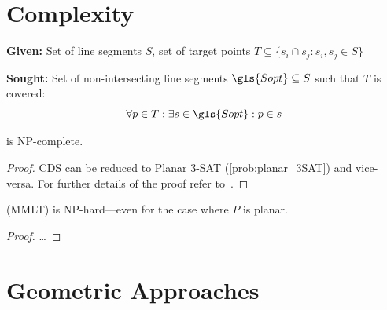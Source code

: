 \section{Complexity}


\begin{problem}
  \label{prob:cds}\hfill
  \begin{labeling}{\hspace{4em}}
    \item[\textbf{Given:}]
      Set of line segments \(S\), 
      set of target points
      \(T \subseteq \{ s_i \cap s_j : s_i,s_j \in S \} \)
    \item[\textbf{Sought:}]
      Set of non-intersecting line segments
      \(\gls{Sopt} \subseteq S\) such that \(T\) is covered:
      \[ \forall p \in T: \exists s \in \gls{Sopt} : p \in s \]
  \end{labeling}
\end{problem}


\begin{theorem}
   is NP-complete.
\end{theorem}

\begin{proof}
  \gls{CDS} can be reduced to Planar 3-SAT (\cref{prob:planar_3SAT})
  and vice-versa. For further details of the proof refer
  to~\cite{mmlt_complexity}.
\end{proof}


\begin{theorem}
   (\gls{MMLT}) is NP-hard---even for the case
  where \(P\) is planar.
\end{theorem}

\begin{proof}
  \ldots{}
\end{proof}

\section{Geometric Approaches}



